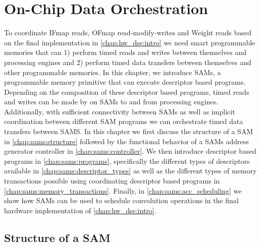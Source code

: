 \chapter{On-Chip Data Orchestration}
\label{chap:data_orchestration}

To coordinate IFmap reads, OFmap read-modify-writes and Weight reads based on
the final implementation in \autoref{chap:hw_dse:intro} we need smart
programmable memories that can 1) perform timed reads and writes between
themselves and processing engines and 2) perform timed data transfers between
themselves and other programmable memories. In this chapter, we introduce \ac{SAM}s, a programmable memory
primitive that can execute descriptor based programs. Depending on the
composition of these descriptor based programs, timed reads and writes can be
made by on SAMs to and from processing engines. Additionally, with sufficient
connectivity between SAMs as well as implicit coordination between different SAM
programs we can orchestrate timed data transfers between SAMS. In this chapter
we first discuss the structure of a SAM in \autoref{chap:sams:structure}
followed by the functional behavior of a SAMs address generator controller in
\autoref{chap:sams:controller}. We then introduce descriptor based programs in
\autoref{chap:sams:programs}, specifically the different types of descriptors
available in \autoref{chap:sams:descriptor_types} as well as the different types
of memory transactions possible using coordinating descriptor based programs in
\autoref{chap:sams:memory_transactions}. Finally, in \autoref{chap:sams:acc_scheduling}
we show how SAMs can be used to schedule convolution operations in the final
hardware implementation of \autoref{chap:hw_dse:intro}.

\clearpage
\section{Structure of a SAM}
\label{chap:sams:structure}

